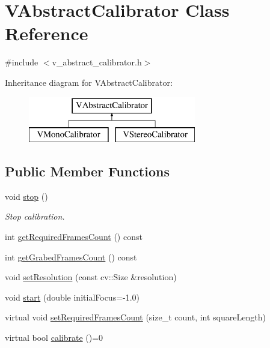 \hypertarget{classVAbstractCalibrator}{
\section{VAbstractCalibrator Class Reference}
\label{classVAbstractCalibrator}
}


{\ttfamily \#include $<$v\_\-abstract\_\-calibrator.h$>$}

Inheritance diagram for VAbstractCalibrator:\begin{figure}[H]
\begin{center}
\leavevmode
\includegraphics[height=2cm]{classVAbstractCalibrator}
\end{center}
\end{figure}
\subsection*{Public Member Functions}
\begin{DoxyCompactItemize}
\item 
\hypertarget{classVAbstractCalibrator_a7df2c56a5879435491b0153fcd5f6a6a}{
void \hyperlink{classVAbstractCalibrator_a7df2c56a5879435491b0153fcd5f6a6a}{stop} ()}
\label{classVAbstractCalibrator_a7df2c56a5879435491b0153fcd5f6a6a}

\begin{DoxyCompactList}\small\item\em Stop calibration. \item\end{DoxyCompactList}\item 
int \hyperlink{classVAbstractCalibrator_a35e8e4978841f1fe517b25eee89f491e}{getRequiredFramesCount} () const 
\item 
int \hyperlink{classVAbstractCalibrator_a76dce19c461a257a803299d7f87d5e5a}{getGrabedFramesCount} () const 
\item 
void \hyperlink{classVAbstractCalibrator_ab4eabbb2a1ce73af601c5fee87da5e24}{setResolution} (const cv::Size \&resolution)
\item 
void \hyperlink{classVAbstractCalibrator_a52f0c84c3d9398102be43f4304d2fa18}{start} (double initialFocus=-\/1.0)
\item 
virtual void \hyperlink{classVAbstractCalibrator_a2c6ac60861d16f185930e7fbf09483f8}{setRequiredFramesCount} (size\_\-t count, int squareLength)
\item 
virtual bool \hyperlink{classVAbstractCalibrator_a7251a0da257534695adcec223d467835}{calibrate} ()=0
\end{DoxyCompactItemize}
